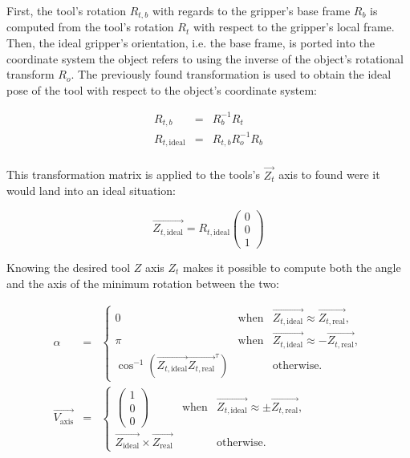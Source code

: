 First, the tool's rotation $R_{t,b}$ with regards to the gripper's
base frame $R_b$
is computed from the tool's rotation $R_t$ with respect to the
gripper's local frame.
Then, the ideal gripper's orientation, i.e. the base frame,  is ported
into the coordinate system the object refers to using the inverse of
the object's rotational transform $R_o$.
The previously found transformation is used to obtain the ideal pose of the
tool with respect to the object's coordinate system:

\begin{eqnarray}
  R_{t,b} &=& R_b^{-1} R_t\\
  R_{t,\text{ideal}} &=& R_{t,b} R_o^{-1} R_{b} \\
\end{eqnarray}

This transformation matrix is applied to the tools's $\vec{Z_t}$ axis to found
were it would land into an ideal situation:

\begin{equation}
  \vec{Z_{t,\text{ideal}}}  = R_{t,\text{ideal}}\begin{pmatrix}0\\0\\1
  \end{pmatrix}
\end{equation}

Knowing the desired tool $Z$ axis $Z_t$ makes it possible to compute
both the angle and the axis of the minimum rotation between the two:

\begin{eqnarray}
  \alpha &=& \left\{
  \begin{array}{lcr}
    0 & \text{when} & \vec{Z_{t,\text{ideal}}} \approx
    \vec{Z_{t,\text{real}}} ,\\
    \pi & \text{when} & \vec{Z_{t,\text{ideal}}} \approx
    -\vec{Z_{t,\text{real}}} ,\\
    \cos^{-1}\left(
    \vec{Z_{t,\text{ideal}}}\vec{Z_{t,\text{real}}}^{\tau}  \right) &
    & \text{otherwise.}
  \end{array} \right. \\
  \vec{V_{\text{axis}}} &=& \left\{
  \begin{array}{lcr}
    \begin{pmatrix}
      1\\0\\0
    \end{pmatrix} & \text{when} & \vec{Z_{t,\text{ideal}}} \approx
    \pm \vec{Z_{t,\text{real}}}, \\
    \vec{Z_{\text{ideal}}} \times \vec{Z_{\text{real}}} &
    & \text{otherwise.} 
  \end{array}\right.
\end{eqnarray}

